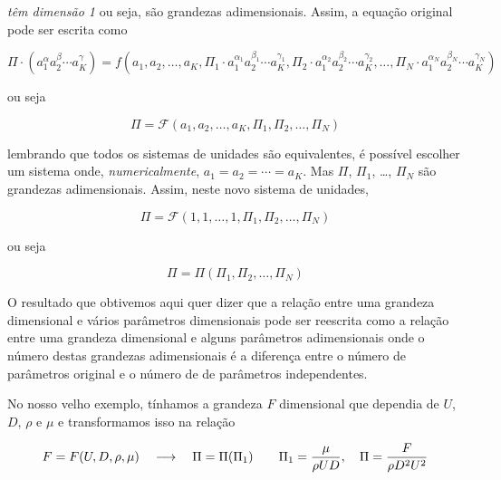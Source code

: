 \emph{têm dimensão 1} ou seja, são grandezas adimensionais. Assim, a equação original pode ser escrita como

\[
\Pi \cdot \left({a_1^\alpha a_2^\beta\cdots a_K^\gamma}\right) =
f\left( a_1, a_2, \ldots, a_K,
\Pi_1 \cdot a_1^{\alpha_1} a_2^{\beta_1}\cdots a_K^{\gamma_1}, 
\Pi_2 \cdot a_1^{\alpha_2} a_2^{\beta_2}\cdots a_K^{\gamma_2}, 
\ldots,
\Pi_N \cdot a_1^{\alpha_N} a_2^{\beta_N}\cdots a_K^{\gamma_N}
\right)
\]

ou seja

\[
\Pi = \mathcal{F}\left(a_1, a_2, \ldots, a_K, \Pi_1, \Pi_2, \ldots, \Pi_N \right)
\]

lembrando que todos os sistemas de unidades são equivalentes, é possível escolher um sistema onde, \emph{numericalmente}, $a_1 = a_2 = \cdots = a_K$. Mas $\Pi$, $\Pi_1$, \ldots, $\Pi_N$ são grandezas adimensionais. Assim, neste novo sistema de unidades, 

\[
\Pi = \mathcal{F}\left(1, 1, \ldots, 1, \Pi_1, \Pi_2, \ldots, \Pi_N \right)
\]

ou seja

\[
\Pi = \Pi\left(\Pi_1, \Pi_2, \ldots, \Pi_N \right)
\]

O resultado que obtivemos aqui quer dizer que a relação entre uma grandeza dimensional e vários parâmetros dimensionais pode ser reescrita como a relação entre uma grandeza dimensional e alguns parâmetros adimensionais onde o número destas grandezas adimensionais é a diferença entre o número de parâmetros original e o número de de parâmetros independentes.

No nosso velho exemplo, tínhamos a grandeza $F$ dimensional que dependia de $U$, $D$, $\rho$ e $\mu$ e transformamos isso na relação

\[
F = F(U, D, \rho, \mu) \quad\longrightarrow\quad \Pi = \Pi(\Pi_1) \qquad \Pi_1 = \frac{\mu}{\rho U D}, \quad \Pi = \frac{F}{\rho D^2 U^2}
\]



